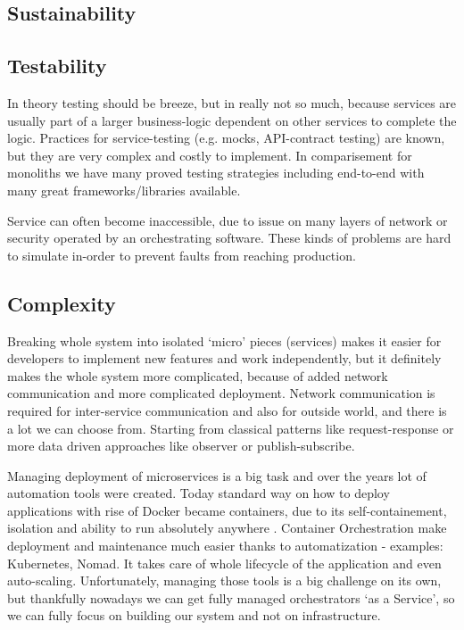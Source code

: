 \subsection{Sustainability}

\subsection{Testability}
In theory testing should be breeze, but in really not so much, because services are usually part of a larger business-logic dependent on other services to complete the logic. Practices for service-testing (e.g. mocks, API-contract testing) are known, but they are very complex and costly to implement. In comparisement for monoliths we have many proved testing strategies including end-to-end with many great frameworks/libraries available. \cite{MC_TESTABILITY}

Service can often become inaccessible, due to issue on many layers of network or security operated by an orchestrating software. These kinds of problems are hard to simulate in-order to prevent faults from reaching production.

\subsection{Complexity}
\label{section:microservices:complexity}
Breaking whole system into isolated `micro' pieces (services) makes it easier for developers to implement new features and work independently, but it definitely makes the whole system more complicated, because of added network communication and more complicated deployment. Network communication is required for inter-service communication and also for outside world, and there is a lot we can choose from. Starting from classical patterns like request-response or more data driven approaches like observer or publish-subscribe.

Managing deployment of microservices is a big task and over the years lot of automation tools were created. Today standard way on how to deploy applications with rise of Docker became containers, due to its self-containement, isolation and ability to run absolutely anywhere \cite{7093032}. Container Orchestration make deployment and maintenance much easier thanks to automatization - examples: Kubernetes\cite{KUBERNETES}, Nomad\cite{NOMAD}. It takes care of whole lifecycle of the application and even auto-scaling. Unfortunately, managing those tools is a big challenge on its own, but thankfully nowadays we can get fully managed orchestrators `as a Service', so we can fully focus on building our system and not on infrastructure.

